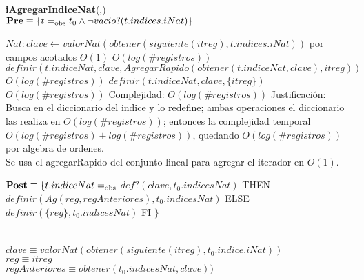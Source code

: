 \begin{algorithm}[H]{\textbf{iAgregarIndiceNat}(,)}
	{\\ $\textbf{Pre} \equiv \{t =_{\mathrm{obs}} t_0 \land \neg vacio?(t.indices.iNat)\}$}
	\begin{algorithmic}[1]
		\State $Nat: clave \gets valorNat(obtener(siguiente(itreg),t.indices.iNat))$	\Comment por campos acotados $\Theta(1)$
			\Comment $O(log (\#registros))$
			\State $definir(t.indiceNat,clave,AgregarRapido(obtener(t.indiceNat,clave),itreg))$ \Comment $O(log (\#registros))$
		\Else
			\State $definir(t.indiceNat,clave,\{itreg\})$ \Comment $O(log (\#registros))$
		\EndIf
		\medskip
		\Statex \underline{Complejidad:} $O(log (\#registros))$
		\Statex \underline{Justificación:} Busca en el diccionario del indice y lo redefine; ambas operaciones el diccionario las realiza en $O(log (\#registros))$; entonces la complejidad temporal $O(log (\#registros) + log (\#registros))$, quedando $O(log (\#registros))$ por algebra de ordenes. \\ Se usa el agregarRapido del conjunto lineal para agregar el iterador en $O(1)$.
	\end{algorithmic}
	{$\textbf{Post} \equiv \{t.indiceNat =_{\mathrm{obs}}$  \IF $def?(clave,t_0.indicesNat)$ THEN $definir(Ag(reg,regAnteriores),t_0.indicesNat)$ ELSE $definir(\{reg\},t_0.indicesNat)$ FI $\}$}\\
	\\ \\
	{$clave \equiv valorNat(obtener(siguiente(itreg),t_0.indice.iNat))$}\\
	{$reg \equiv itreg$} \\
	{$regAnteriores \equiv obtener(t_0.indicesNat,clave))$}
\end{algorithm}

